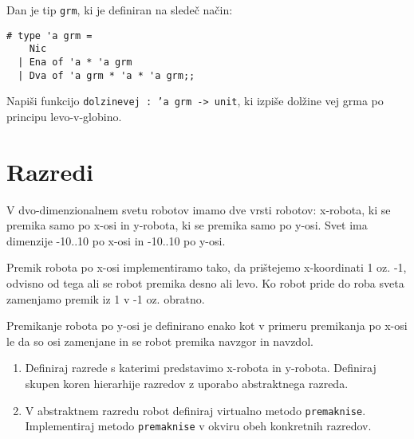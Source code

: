 \begin{ex}
  Dan je tip \texttt{grm}, ki je definiran na slede\v c na\v cin:

\begin{verbatim}
# type 'a grm = 
    Nic 
  | Ena of 'a * 'a grm 
  | Dva of 'a grm * 'a * 'a grm;;
\end{verbatim}

  Napi\v si funkcijo \texttt{dolzinevej : 'a grm -> unit}, ki izpi\v
  se dol\v zine vej grma po principu levo-v-globino.


\section{Razredi}

\end{ex} 
\begin{ex}
  V dvo-dimenzionalnem svetu robotov imamo dve vrsti robotov:
  x-robota, ki se premika samo po x-osi in y-robota, ki se premika
  samo po y-osi. Svet ima dimenzije -10..10 po x-osi in -10..10 po
  y-osi.

  Premik robota po x-osi implementiramo tako, da pri\v stejemo
  x-koordinati 1 oz. -1, odvisno od tega ali se robot premika desno
  ali levo. Ko robot pride do roba sveta zamenjamo premik iz 1 v -1
  oz. obratno.

  Premikanje robota po y-osi je definirano enako kot v primeru
  premikanja po x-osi le da so osi zamenjane in se robot premika
  navzgor in navzdol.

  \begin{enumerate}
  \item Definiraj razrede s katerimi predstavimo x-robota in
    y-robota. Definiraj skupen koren hierarhije razredov z uporabo
    abstraktnega razreda.

  \item V abstraktnem razredu robot definiraj virtualno metodo
    \texttt{premaknise}. Implementiraj metodo \texttt{premaknise} v
    okviru obeh konkretnih razredov.
  \end{enumerate}




\end{ex} 
